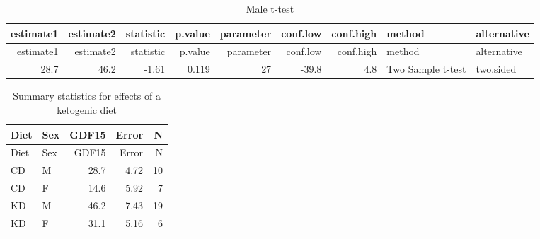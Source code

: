 \documentclass[]{article}
\newenvironment{Shaded}{\begin{snugshade}}{\end{snugshade}}
\newcommand{\DataTypeTok}[1]{\textcolor[rgb]{0.13,0.29,0.53}{#1}}
\newcommand{\KeywordTok}[1]{\textcolor[rgb]{0.13,0.29,0.53}{\textbf{#1}}}
\newcommand{\NormalTok}[1]{#1}
\newcommand{\OperatorTok}[1]{\textcolor[rgb]{0.81,0.36,0.00}{\textbf{#1}}}
\newcommand{\StringTok}[1]{\textcolor[rgb]{0.31,0.60,0.02}{#1}}
\begin{document}
\begin{longtable}[]{@{}rrrrrrrll@{}}
\caption{Male t-test}\tabularnewline
\toprule
estimate1 & estimate2 & statistic & p.value & parameter & conf.low &
conf.high & method & alternative\tabularnewline
\midrule
\endfirsthead
\toprule
estimate1 & estimate2 & statistic & p.value & parameter & conf.low &
conf.high & method & alternative\tabularnewline
\midrule
\endhead
28.7 & 46.2 & -1.61 & 0.119 & 27 & -39.8 & 4.8 & Two Sample t-test &
two.sided\tabularnewline
\bottomrule
\end{longtable}

\begin{Shaded}
\end{Shaded}

\begin{longtable}[]{@{}llrrr@{}}
\caption{Summary statistics for effects of a ketogenic
diet}\tabularnewline
\toprule
Diet & Sex & GDF15 & Error & N\tabularnewline
\midrule
\endfirsthead
\toprule
Diet & Sex & GDF15 & Error & N\tabularnewline
\midrule
\endhead
CD & M & 28.7 & 4.72 & 10\tabularnewline
CD & F & 14.6 & 5.92 & 7\tabularnewline
KD & M & 46.2 & 7.43 & 19\tabularnewline
KD & F & 31.1 & 5.16 & 6\tabularnewline
\bottomrule
\end{longtable}

\begin{Shaded}
\end{Shaded}
\end{document}
